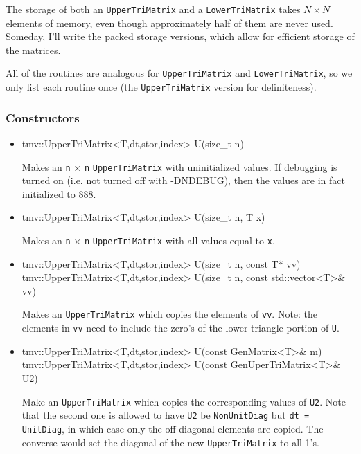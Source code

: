 \documentclass[twoside,letterpaper,11pt]{article}
\renewcommand{\tt}[1]{{\lstinline {#1}}}
\begin{document}
The storage of both an \tt{UpperTriMatrix} and a \tt{LowerTriMatrix} takes
$N \times N$ elements of memory, even though approximately half of them 
are never used.  Someday, I'll write the packed storage versions, which allow for
efficient storage of the matrices.

All of the routines are analogous for \tt{UpperTriMatrix} and 
\tt{LowerTriMatrix}, so we only list each routine once 
(the \tt{UpperTriMatrix} version for
definiteness).  

\subsubsection{Constructors}

\begin{itemize}
\item 
\begin{tmvcode}
tmv::UpperTriMatrix<T,dt,stor,index> U(size_t n)
\end{tmvcode}
Makes an \tt{n} $\times$ \tt{n} \tt{UpperTriMatrix} with \underline{uninitialized} values.
If debugging is turned on (i.e. not turned off
with -DNDEBUG), then the values are in fact initialized to 888.  

\item
\begin{tmvcode}
tmv::UpperTriMatrix<T,dt,stor,index> U(size_t n, T x)
\end{tmvcode}
Makes an \tt{n} $\times$ \tt{n} \tt{UpperTriMatrix} with all values equal to \tt{x}.

\item
\begin{tmvcode}
tmv::UpperTriMatrix<T,dt,stor,index> U(size_t n, const T* vv)
tmv::UpperTriMatrix<T,dt,stor,index> U(size_t n, 
      const std::vector<T>& vv)
\end{tmvcode}
Makes an \tt{UpperTriMatrix} which copies the elements of \tt{vv}.
Note: the elements in \tt{vv} need to include the zero's of the lower triangle 
portion of \tt{U}.

\item 
\begin{tmvcode}
tmv::UpperTriMatrix<T,dt,stor,index> U(const GenMatrix<T>& m)
tmv::UpperTriMatrix<T,dt,stor,index> U(const GenUperTriMatrix<T>& U2)
\end{tmvcode}
Make an \tt{UpperTriMatrix} which copies the corresponding values of
\tt{U2}.  Note that the second one is allowed to have \tt{U2} be
\tt{NonUnitDiag} but \tt{dt = UnitDiag}, in which case only the 
off-diagonal elements are copied.  The converse would set the 
diagonal of the new \tt{UpperTriMatrix} to all 1's.


\end{itemize}
\end{document}
